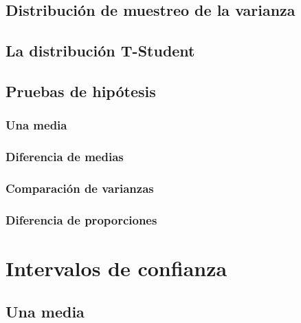 \documentclass[
]{book}
\begin{document}
\hypertarget{distribuciuxf3n-de-muestreo-de-la-varianza}{%
\section{Distribución de muestreo de la varianza}\label{distribuciuxf3n-de-muestreo-de-la-varianza}}

\hypertarget{la-distribuciuxf3n-t-student}{%
\section{La distribución T-Student}\label{la-distribuciuxf3n-t-student}}

\hypertarget{pruebas-de-hipuxf3tesis}{%
\section{Pruebas de hipótesis}\label{pruebas-de-hipuxf3tesis}}

\hypertarget{una-media}{%
\subsection{Una media}\label{una-media}}

\hypertarget{diferencia-de-medias}{%
\subsection{Diferencia de medias}\label{diferencia-de-medias}}

\hypertarget{comparaciuxf3n-de-varianzas}{%
\subsection{Comparación de varianzas}\label{comparaciuxf3n-de-varianzas}}

\hypertarget{diferencia-de-proporciones}{%
\subsection{Diferencia de proporciones}\label{diferencia-de-proporciones}}

\hypertarget{intervalos-de-confianza}{%
\chapter{Intervalos de confianza}\label{intervalos-de-confianza}}

\hypertarget{una-media-1}{%
\section{Una media}\label{una-media-1}}
\end{document}
